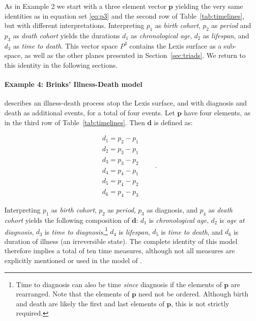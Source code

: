 \documentclass[12pt,oneside,a4paper]{article} %
\theoremstyle{definition}
\begin{document}
As in Example 2 we start with a three element vector
$\textbf{p}$ yielding the very same identities as in equation set
\eqref{eq:p3} and the second row of Table~\ref{tab:timelines}, but with different interpretations.
Interpreting $p_1$ as \textit{birth cohort}, $p_2$ as \textit{period} and $p_3$ as \textit{death cohort} yields the durations $d_1$ as \textit{chronological age},
$d_2$ as \textit{lifespan}, and $d_3$ as \textit{time to death}. This
vector space $P^3$ contains the Lexis surface as a sub-space, as well as the
other planes presented in Section~\ref{sec:triads}. We return to this identity
in the following sections.

\paragraph{Example 4: Brinks' Illness-Death model}

\citet{brinks2014lexis} describes an illness-death process atop the Lexis
surface, and with diagnosis and death as additional events, for a total of four
events. Let $\textbf{p}$ have four elements, as in the third row of
Table~\ref{tab:timelines}. Then $\textbf{d}$ is defined as:

\begin{equation}
\label{eq:p3}
\begin{matrix}
d_1 = p_2 - p_1\\
d_2 = p_3 - p_1\\
d_3 = p_3 - p_2\\
d_4 = p_4 - p_1\\
d_5 = p_4 - p_2\\
d_6 = p_4 - p_3
\end{matrix} \quad\quad.
\end{equation}

Interpreting $p_1$ as \textit{birth cohort}, $p_2$ as \textit{period}, $p_3$ as
diagnosis, and $p_4$ as \textit{death cohort} yields the following composition
of $\textbf{d}$: $d_1$ is \textit{chronological age}, $d_2$ is \textit{age at
diagnosis}, $d_3$ is \textit{time to diagnosis},\footnote{Time to diagnosis can
also be time \textit{since} diagnosis if the elements of $\textbf{p}$ are
rearranged.
Note that the elements of $\textbf{p}$ need not be ordered. Although
birth and death are likely the first and last elements of $\textbf{p}$, this is
not strictly required.} $d_4$ is \textit{lifespan}, $d_5$ is \textit{time to
death}, and $d_6$ is duration of illness (an irreversible state). The complete
identity of this model therefore implies a total of ten time measures, although
not all measures are explicitly mentioned or used in the model of
\citet{brinks2014lexis}.
\end{document}
